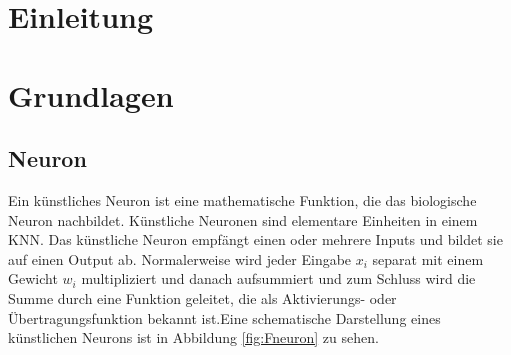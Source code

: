 \documentclass[12pt,a4paper]{scrartcl}
\numberwithin{equation}{section}
\begin{document}
  \tableofcontents
  \listoffigures

\newpage
 


  \pagestyle{headings}

\section{Einleitung}



 \newpage  %
 
\section{Grundlagen}\label{Grundlaagen}
\subsection{Neuron}
Ein künstliches Neuron\cite{kneuron} ist eine mathematische Funktion, die das biologische Neuron nachbildet. Künstliche Neuronen sind elementare Einheiten in einem \ac{KNN}. Das künstliche Neuron empfängt einen oder mehrere Inputs und bildet sie auf einen Output ab. Normalerweise wird jeder Eingabe $ x_i $ separat mit einem Gewicht $ w_i $ multipliziert und danach aufsummiert und zum Schluss wird die Summe durch eine Funktion geleitet, die als Aktivierungs- oder Übertragungsfunktion bekannt ist.Eine schematische Darstellung eines künstlichen Neurons ist in Abbildung \ref{fig:Fneuron}
zu sehen.
\end{document}
